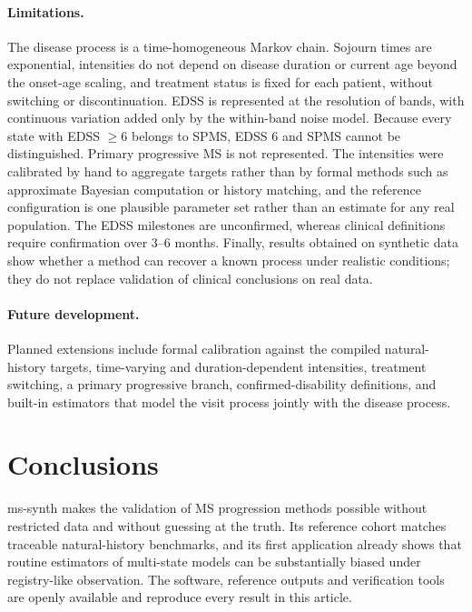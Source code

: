 \documentclass[11pt,a4paper]{article}
\begin{document}
\paragraph{Limitations.}
The disease process is a time-homogeneous Markov chain. Sojourn times are exponential, intensities do not depend on disease duration or current age beyond the onset-age scaling, and treatment status is fixed for each patient, without switching or discontinuation. EDSS is represented at the resolution of bands, with continuous variation added only by the within-band noise model. Because every state with EDSS $\geq 6$ belongs to SPMS, EDSS 6 and SPMS cannot be distinguished. Primary progressive MS is not represented. The intensities were calibrated by hand to aggregate targets rather than by formal methods such as approximate Bayesian computation or history matching, and the reference configuration is one plausible parameter set rather than an estimate for any real population. The EDSS milestones are unconfirmed, whereas clinical definitions require confirmation over 3--6 months. Finally, results obtained on synthetic data show whether a method can recover a known process under realistic conditions; they do not replace validation of clinical conclusions on real data.

\paragraph{Future development.}
Planned extensions include formal calibration against the compiled natural-history targets, time-varying and duration-dependent intensities, treatment switching, a primary progressive branch, confirmed-disability definitions, and built-in estimators that model the visit process jointly with the disease process.

\section*{Conclusions}

ms-synth makes the validation of MS progression methods possible without restricted data and without guessing at the truth. Its reference cohort matches traceable natural-history benchmarks, and its first application already shows that routine estimators of multi-state models can be substantially biased under registry-like observation. The software, reference outputs and verification tools are openly available and reproduce every result in this article.
\end{document}
